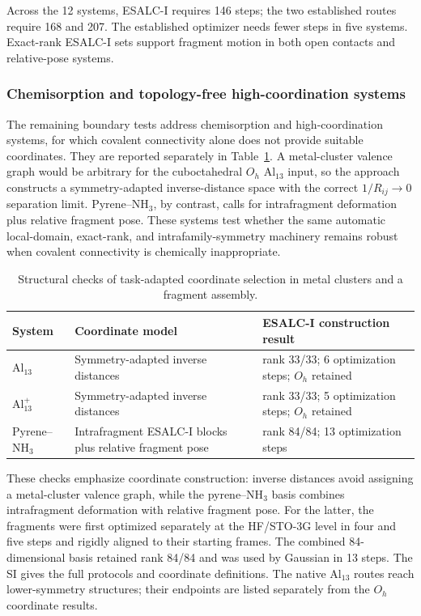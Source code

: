 \documentclass[journal=jctcce,manuscript=article,layout=traditional]{achemso}
\theoremstyle{definition}
\begin{document}
{Across the 12 systems, ESALC-I requires 146 steps; the two established
routes require 168 and 207.  The established optimizer needs fewer steps in
five systems.  Exact-rank ESALC-I sets support fragment motion in both open
contacts and relative-pose systems.}

\subsubsection{Chemisorption and topology-free high-coordination systems}
\label{sec:chemisorption-boundary}

{The remaining boundary tests address chemisorption and high-coordination
systems, for which covalent connectivity alone does not provide suitable coordinates.}  They are reported separately in
Table~\ref{tab:task-adapted-boundary-tests}.  A metal-cluster valence graph
would be arbitrary for the cuboctahedral \(O_h\) Al$_{13}$ input, so the
approach constructs a symmetry-adapted inverse-distance space with the
correct $1/R_{ij}\to0$ separation limit.
Pyrene--NH$_3$, by contrast, calls for intrafragment deformation plus relative
fragment pose.  These systems test whether the same automatic local-domain,
exact-rank, and intrafamily-symmetry machinery remains robust when covalent
connectivity is chemically inappropriate.

\begin{table}[H]
\centering
\scriptsize
\setlength{\tabcolsep}{4.0pt}
\caption{{Structural checks of task-adapted coordinate
selection in metal clusters and a fragment assembly.}}
\label{tab:task-adapted-boundary-tests}
{
\begin{tabularx}{\linewidth}{@{}lX X@{}}
\toprule
System & Coordinate model & ESALC-I construction result \\
\midrule
Al$_{13}$ & Symmetry-adapted inverse distances & rank 33/33; 6 optimization steps; \(O_h\) retained \\
Al$_{13}^{+}$ & Symmetry-adapted inverse distances & rank 33/33; 5 optimization steps; \(O_h\) retained \\
Pyrene--NH$_3$ & Intrafragment ESALC-I blocks plus relative fragment pose & rank 84/84; 13 optimization steps \\
\bottomrule
\end{tabularx}
}
\end{table}

{These checks emphasize coordinate construction: inverse
distances avoid assigning a metal-cluster valence graph, while the
pyrene--NH$_3$ basis combines intrafragment deformation with relative
fragment pose.  For the latter, the fragments were first optimized separately
at the HF/STO-3G level in four and five steps and rigidly aligned to their starting
frames.  The combined 84-dimensional basis retained rank 84/84 and was
used by Gaussian in 13 steps.  The SI gives the full protocols and
coordinate definitions.}
{The native Al$_{13}$ routes reach lower-symmetry structures; their
endpoints are listed separately from the \(O_h\) coordinate results.}
\end{document}

